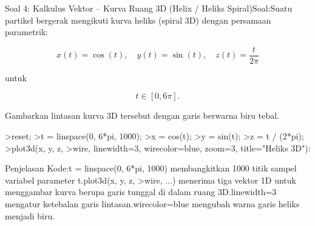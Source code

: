 \documentclass[a4paper,10pt]{article}
\begin{document}
\begin{eulernotebook}
\begin{eulercomment}
\begin{eulercomment}
\begin{eulercomment}
Soal 4: Kalkulus Vektor – Kurva Ruang 3D (Helix / Heliks
Spiral)Soal:Suatu partikel bergerak mengikuti kurva heliks (spiral 3D)
dengan persamaan parametrik:\\
\end{eulercomment}
\begin{eulerformula}
\[
x(t) = \cos(t), \quad y(t) = \sin(t), \quad z(t) = \frac{t}{2\pi}
\]
\end{eulerformula}
\begin{eulercomment}
untuk\\
\end{eulercomment}
\begin{eulerformula}
\[
t \in [0, 6\pi].
\]
\end{eulerformula}
\begin{eulercomment}
Gambarkan lintasan kurva 3D tersebut dengan garis berwarna biru tebal.
\end{eulercomment}
\begin{eulerprompt}
>reset;
>t = linspace(0, 6*pi, 1000);
>x = cos(t);
>y = sin(t);
>z = t / (2*pi);
>plot3d(x, y, z, >wire, linewidth=3, wirecolor=blue, zoom=3, title="Heliks 3D"):
\end{eulerprompt}
\begin{eulercomment}
Penjelasan Kode:t = linspace(0, 6*pi, 1000) membangkitkan 1000 titik
sampel variabel parameter t.plot3d(x, y, z, \textgreater{}wire, ...) menerima tiga
vektor 1D untuk menggambar kurva berupa garis tunggal di dalam ruang
3D.linewidth=3 mengatur ketebalan garis lintasan.wirecolor=blue
mengubah warna garis heliks menjadi biru.



\end{eulercomment}
\end{eulercomment}
\end{eulercomment}
\end{eulernotebook}
\end{document}

